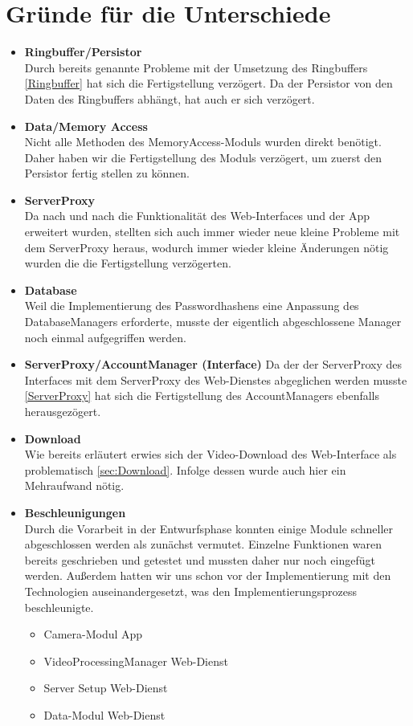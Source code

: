 \section{Gründe für die Unterschiede} \label{sec:PlanDiff}
\begin{itemize}

\item \textbf{Ringbuffer/Persistor} \hfill \\
Durch bereits genannte Probleme mit der Umsetzung des Ringbuffers \eqref{Ringbuffer} hat sich die Fertigstellung verzögert. Da der Persistor von den Daten des Ringbuffers abhängt, hat auch er sich verzögert.

\item \textbf{Data/Memory Access} \hfill \\
Nicht alle Methoden des MemoryAccess-Moduls wurden direkt benötigt. Daher haben wir die Fertigstellung des Moduls verzögert, um zuerst den Persistor fertig stellen zu können.

\item \label{ServerProxy} \textbf{ServerProxy} \hfill \\
Da nach und nach die Funktionalität des Web-Interfaces und der App erweitert wurden, stellten sich auch immer wieder neue kleine Probleme mit dem ServerProxy heraus, wodurch immer wieder kleine Änderungen nötig wurden die die Fertigstellung verzögerten.

\item \textbf{Database} \hfill \\
Weil die Implementierung des Passwordhashens eine Anpassung des DatabaseManagers erforderte, musste der eigentlich abgeschlossene Manager noch einmal aufgegriffen werden.

\item \textbf{ServerProxy/AccountManager (Interface)}
Da der der ServerProxy des Interfaces mit dem ServerProxy des Web-Dienstes abgeglichen werden musste \eqref{ServerProxy} hat sich die Fertigstellung des AccountManagers ebenfalls herausgezögert.

\item \textbf{Download} \hfill \\
Wie bereits erläutert erwies sich der Video-Download des Web-Interface als problematisch \eqref{sec:Download}. Infolge dessen wurde auch hier ein Mehraufwand nötig.

\item \textbf{Beschleunigungen} \hfill \\
Durch die Vorarbeit in der Entwurfsphase konnten einige Module schneller abgeschlossen werden als zunächst vermutet. Einzelne Funktionen waren bereits geschrieben und getestet und mussten daher nur noch eingefügt werden. Außerdem hatten wir uns schon vor der Implementierung mit den Technologien auseinandergesetzt, was den Implementierungsprozess beschleunigte.
\begin{itemize}
\itemsep0pt
\item Camera-Modul App
\item VideoProcessingManager Web-Dienst
\item Server Setup Web-Dienst
\item Data-Modul Web-Dienst
\end{itemize}
\end{itemize}